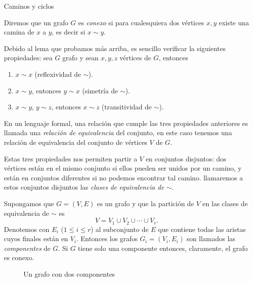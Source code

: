 \begin{section}{Caminos y ciclos}
\begin{definicion} Diremos que un grafo  $G$ es \textit{conexo} si para cualesquiera dos vértices $x,y$ existe una camina de $x$ a $y$, es decir si  $x \sim y$. 
\end{definicion}

Debido al lema que probamos más arriba, es sencillo verificar la siguientes propiedades: sea $G$ grafo y sean $x,y,z$ vértices de $G$, entonces
\begin{enumerate}[label=(\alph*)]
\item  $x \sim x$ (reflexividad de $\sim$).
\item  $x \sim y$, entonces $y \sim x$ (simetría de $\sim$).
\item  $x \sim y$,  $y \sim z$, entonces  $x \sim z$ (transitividad  de $\sim$).
\end{enumerate}


En un lenguaje formal, una relación que  cumple las tres propiedades anteriores es llamada una  {\em relación de equivalencia} del conjunto, en este caso tenemos una relación de equivalencia del conjunto de vértices $V$ de $G$. 

Estas tres propiedades nos permiten partir a $V$ en conjuntos disjuntos: dos vértices están en el mismo conjunto si ellos pueden
ser unidos por un camino, y están en conjuntos diferentes si no podemos encontrar tal camino. llamaremos a estos conjuntos disjuntos las {\em clases de equivalencia de $\sim$}.

\begin{definicion}Supongamos que $G=(V,E)$ es un grafo y
que la partición de $V$ en las clases de equivalencia de $\sim$ es
$$
V= V_1 \cup V_2 \cup \cdots \cup V_r.
$$
Denotemos con $E_i$ ($1\le i \le r$) al subconjunto de $E$ que
contiene todas las aristas cuyos finales están en $V_i$. Entonces
los grafos $G_i=(V_i,E_i)$ son llamados las {\em componentes}    
de $G$. Si $G$ tiene solo una componente entonces, claramente, el grafo es {conexo}.
\end{definicion}



\begin{figure}[t]
	\begin{center}
\end{center}
\caption{Un grafo con dos componentes} \label{f5.6}
\end{figure}


\end{section}

